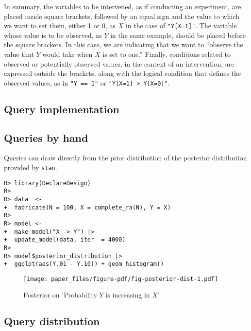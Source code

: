 \documentclass[
  11pt,
  article]{jss}
\begin{document}
In summary, the variables to be intervened, as if conducting an
experiment, are placed inside square brackets, followed by an equal sign
and the value to which we want to set them, either 1 or 0, as \(X\) in
the case of \texttt{"Y{[}X=1{]}"}. The variable whose value is to be
observed, as \(Y\) in the same example, should be placed before the
square brackets. In this case, we are indicating that we want to
``observe the value that \(Y\) would take when \(X\) is set to one.''
Finally, conditions related to observed or potentially observed values,
in the context of an intervention, are expressed outside the brackets,
along with the logical condition that defines the observed values, as in
\texttt{"Y\ ==\ 1"} or
\texttt{"Y{[}X=1{]}\ \textgreater{}\ Y{[}X=0{]}"}.

\hypertarget{query-implementation}{%
\subsection{Query implementation}\label{query-implementation}}

\hypertarget{queries-by-hand}{%
\subsection{Queries by hand}\label{queries-by-hand}}

Queries can draw directly from the prior distribution of the posterior
distribution provided by \texttt{stan}.

\begin{verbatim}
R> library(DeclareDesign)
R> 
R> data  <- 
+  fabricate(N = 100, X = complete_ra(N), Y = X)
R> 
R> model <- 
+  make_model("X -> Y") |>
+  update_model(data, iter  = 4000)
R> 
R> model$posterior_distribution |> 
+  ggplot(aes(Y.01 - Y.10)) + geom_histogram()
\end{verbatim}

\begin{figure}[t]

{\centering \texttt{[image: paper\_files/figure-pdf/fig-posterior-dist-1.pdf]}

}

\caption{\label{fig-posterior-dist}Posterior on 'Probability \(Y\) is
increasing in \(X\)'}

\end{figure}

\FloatBarrier

\hypertarget{query-distribution}{%
\subsection{Query distribution}\label{query-distribution}}
\end{document}
